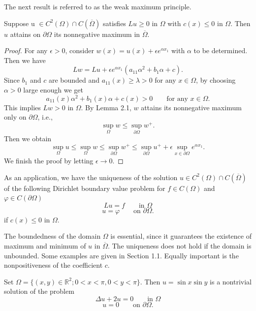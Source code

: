 The next result is referred to as the weak maximum principle.

\begin{lemma}\label{hanlin:maxprin-lemma-2-3}
Suppose u $\in C^2(\Omega)\cap C(\overline{\Omega})$ satisfies $Lu \ge 0$ in $\Omega$ with $c(x) \le 0$ in
$\Omega$. Then $u$ attains on $\partial \Omega$ its nonnegative maximum in $\overline{\Omega}$.
\end{lemma}
\begin{proof}
\sketch
For any $\epsilon > 0$, consider $w(x) = u(x) + \epsilon e^{\alpha x_1}$ with $\alpha$ to be determined.
Then we have
\[
Lw = Lu + \epsilon e^{\alpha x_1}(a_{11}\alpha^2 + b_1\alpha + c).
\]
Since $b_1$ and $c$ are bounded and $a_{11}(x) \ge \lambda > 0$ for any $x \in \Omega$, by choosing $\alpha > 0$
large enough we get
\[
a_{11}(x)\alpha^2 + b_1(x)\alpha + c(x) > 0 \qquad \text{for any } x \in \Omega.
\]
This implies $Lw > 0$ in $\Omega$. By Lemma 2.1, $w$ attains its nonnegative maximum
only on $\partial \Omega$, i.e.,
\[
\sup_{\Omega} w \le \sup_{\partial \Omega} w^+.
\]
Then we obtain
\[
\sup_{\Omega} u \le \sup_{\Omega} w \le \sup_{\partial \Omega} w^+
\le \sup_{\partial \Omega} u^+ + \epsilon \sup_{x \in \partial \Omega} e^{\alpha x_1}.
\]
We finish the proof by letting $\epsilon \to 0$.
\end{proof}

As an application, we have the uniqueness of the solution $u \in C^2(\Omega)\cap C(\overline{\Omega})$ of
the following Dirichlet boundary value problem for $f \in C(\Omega)$ and $\varphi \in C(\partial \Omega)$
\[
Lu = f \qquad \text{in } \Omega
\]
\[
u = \varphi \qquad \text{on } \partial \Omega.
\]
if $c(x) \le 0$ in $\Omega$.

\begin{remark}\label{hanlin:maxprin-remark-2-4}
The boundedness of the domain $\Omega$ is essential, since it guarantees
the existence of maximum and minimum of $u$ in $\overline{\Omega}$. The uniqueness does not hold
if the domain is unbounded. Some examples are given in Section 1.1. Equally
important is the nonpositiveness of the coefficient $c$.
\end{remark}

\begin{example}\label{hanlin:maxprin-example-2-5}
Set $\Omega = \{(x,y) \in \mathbb{R}^2; 0 < x < \pi, 0 < y < \pi\}$. Then $u =
\sin x \sin y$ is a nontrivial solution of the problem
\[
\Delta u + 2u = 0 \qquad \text{in } \Omega
\]
\[
u = 0 \qquad \text{on } \partial \Omega.
\]
\end{example}


